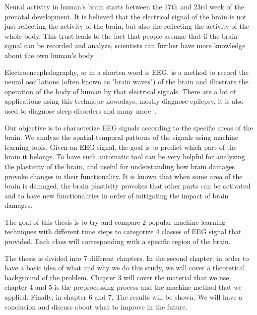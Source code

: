 Neural activity in human's brain starts between the 17th and 23rd week of the prenatal development. It is believed that the electrical signal of the brain is not just reflecting the activity of the brain, but also the reflecting the activity of the whole body. This trust leads to the fact that people assume that if the brain signal can be recorded and analyze, scientists can further have more knowledge about the own human's body~\cite{EEGSignalProcessing}.

 Electroencephalography, or in a shorten word is EEG, is a method to record the neural oscillations (often known as "brain waves") of the brain and illustrate the operation of the body of human by that electrical signals. There are a lot of applications using this technique nowadays, mostly diagnose epilepsy, it is also used to diagnose sleep disorders and many more~\cite{EEG2}.
 
 Our objective is to characterize EEG signals according to the specific areas of the brain. We analyze the spatial-temporal patterns of the signals using machine learning tools. Given an EEG signal, the goal is to predict which part of the brain it belongs. To have such automatic tool can be very helpful for analyzing the plasticity of the brain, and useful for understanding how brain damages provoke changes in their functionality. It is known that when some area of the brain is damaged, the brain plasticity provokes that other parts can be activated and to have new functionalities in order of mitigating the impact of brain damages.

The goal of this thesis is to try and compare 2 popular machine learning techniques with different time steps to categorize 4 classes of EEG signal that provided. Each class will corresponding with a specific region of the brain.

The thesis is divided into 7 different chapters. In the second chapter, in order to have a basic idea of what and why we do this study, we will cover a theoretical background of the problem. Chapter 3 will cover the material that we use, chapter 4 and 5 is the preprocessing process and the machine method that we applied. Finally, in chapter 6 and 7, The results will be shown. We will have a conclusion and discuss about what to improve in the future.